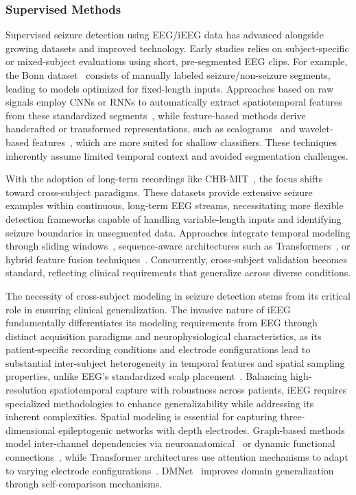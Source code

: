 \subsubsection{Supervised Methods}
Supervised seizure detection using EEG/iEEG data has advanced alongside growing datasets and improved technology. Early studies relies on subject-specific or mixed-subject evaluations using short, pre-segmented EEG clips. For example, the Bonn dataset~\cite{andrzejak2001indications} consists of manually labeled seizure/non-seizure segments, leading to models optimized for fixed-length inputs. Approaches based on raw signals employ CNNs or RNNs to automatically extract spatiotemporal features from these standardized segments~\cite{ACHARYA2018270,ULLAH201861}, while feature-based methods derive handcrafted or transformed representations, such as scalograms~\cite{turk2019epilepsy} and wavelet-based features~\cite{Seizure58}, which are more suited for shallow classifiers. These techniques inherently assume limited temporal context and avoided segmentation challenges.

With the adoption of long-term recordings like CHB-MIT~\cite{shoeb2009application}, the focus shifts toward cross-subject paradigms. These datasets provide extensive seizure examples within continuous, long-term EEG streams, necessitating more flexible detection frameworks capable of handling variable-length inputs and identifying seizure boundaries in unsegmented data. Approaches integrate temporal modeling through sliding windows~\cite{xu2023patient}, sequence-aware architectures such as Transformers~\cite{lih2023epilepsynet}, or hybrid feature fusion techniques~\cite{dutta2024deep}. Concurrently, cross-subject validation becomes standard, reflecting clinical requirements that generalize across diverse conditions.

The necessity of cross-subject modeling in seizure detection stems from its critical role in ensuring clinical generalization.
The invasive nature of iEEG fundamentally differentiates its modeling requirements from EEG through distinct acquisition paradigms and neurophysiological characteristics, as its patient-specific recording conditions and electrode configurations lead to substantial inter-subject heterogeneity in temporal features and spatial sampling properties, unlike EEG's standardized scalp placement~\cite{zhang2024brant}. Balancing high-resolution spatiotemporal capture with robustness across patients, iEEG requires specialized methodologies to enhance generalizability while addressing its inherent complexities.
Spatial modeling is essential for capturing three-dimensional epileptogenic networks with depth electrodes. Graph-based methods model inter-channel dependencies via neuroanatomical~\cite{9345750} or dynamic functional connections~\cite{rahmani2023meta}, while Transformer architectures use attention mechanisms to adapt to varying electrode configurations~\cite{sun2022continuous}.
DMNet~\cite{tudmnet} improves domain generalization through self-comparison mechanisms.


